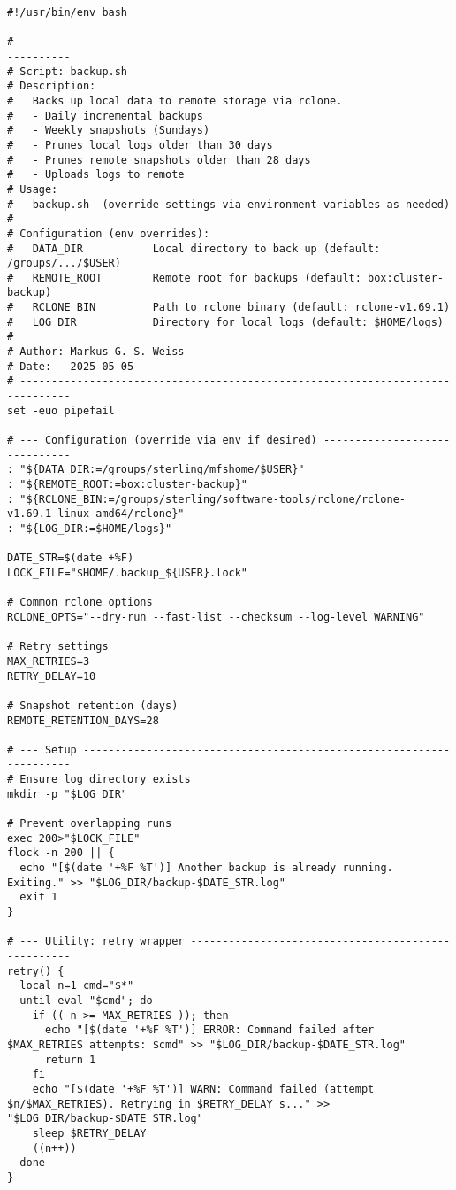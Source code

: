 \documentclass[12pt,letterpaper]{article}
\begin{document}
\begin{lstlisting}[style=custombash]
#!/usr/bin/env bash

# ------------------------------------------------------------------------------
# Script: backup.sh
# Description:
#   Backs up local data to remote storage via rclone.
#   - Daily incremental backups
#   - Weekly snapshots (Sundays)
#   - Prunes local logs older than 30 days
#   - Prunes remote snapshots older than 28 days
#   - Uploads logs to remote
# Usage:
#   backup.sh  (override settings via environment variables as needed)
#
# Configuration (env overrides):
#   DATA_DIR           Local directory to back up (default: /groups/.../$USER)
#   REMOTE_ROOT        Remote root for backups (default: box:cluster-backup)
#   RCLONE_BIN         Path to rclone binary (default: rclone-v1.69.1)
#   LOG_DIR            Directory for local logs (default: $HOME/logs)
#
# Author: Markus G. S. Weiss
# Date:   2025-05-05
# ------------------------------------------------------------------------------
set -euo pipefail

# --- Configuration (override via env if desired) ------------------------------
: "${DATA_DIR:=/groups/sterling/mfshome/$USER}"
: "${REMOTE_ROOT:=box:cluster-backup}"
: "${RCLONE_BIN:=/groups/sterling/software-tools/rclone/rclone-v1.69.1-linux-amd64/rclone}"
: "${LOG_DIR:=$HOME/logs}"

DATE_STR=$(date +%F)
LOCK_FILE="$HOME/.backup_${USER}.lock"

# Common rclone options
RCLONE_OPTS="--dry-run --fast-list --checksum --log-level WARNING"

# Retry settings
MAX_RETRIES=3
RETRY_DELAY=10

# Snapshot retention (days)
REMOTE_RETENTION_DAYS=28

# --- Setup --------------------------------------------------------------------
# Ensure log directory exists
mkdir -p "$LOG_DIR"

# Prevent overlapping runs
exec 200>"$LOCK_FILE"
flock -n 200 || {
  echo "[$(date '+%F %T')] Another backup is already running. Exiting." >> "$LOG_DIR/backup-$DATE_STR.log"
  exit 1
}

# --- Utility: retry wrapper ---------------------------------------------------
retry() {
  local n=1 cmd="$*"
  until eval "$cmd"; do
    if (( n >= MAX_RETRIES )); then
      echo "[$(date '+%F %T')] ERROR: Command failed after $MAX_RETRIES attempts: $cmd" >> "$LOG_DIR/backup-$DATE_STR.log"
      return 1
    fi
    echo "[$(date '+%F %T')] WARN: Command failed (attempt $n/$MAX_RETRIES). Retrying in $RETRY_DELAY s..." >> "$LOG_DIR/backup-$DATE_STR.log"
    sleep $RETRY_DELAY
    ((n++))
  done
}


\end{lstlisting}
\end{document}
